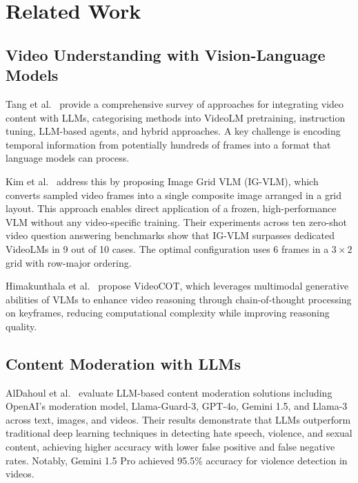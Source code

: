 \documentclass[12pt,a4paper]{article}
\begin{document}
\section{Related Work}

\subsection{Video Understanding with Vision-Language Models}

Tang et al.~\cite{tang2023vidllm} provide a comprehensive survey of
approaches for integrating video content with LLMs, categorising methods
into VideoLM pretraining, instruction tuning, LLM-based agents, and
hybrid approaches. A key challenge is encoding temporal information from
potentially hundreds of frames into a format that language models can
process.

Kim et al.~\cite{kim2024imagegrid} address this by proposing Image Grid
VLM (IG-VLM), which converts sampled video frames into a single composite
image arranged in a grid layout. This approach enables direct application
of a frozen, high-performance VLM without any video-specific training.
Their experiments across ten zero-shot video question answering benchmarks
show that IG-VLM surpasses dedicated VideoLMs in 9 out of 10 cases.
The optimal configuration uses 6 frames in a $3 \times 2$ grid with
row-major ordering.

Himakunthala et al.~\cite{himakunthala2023videocot} propose VideoCOT,
which leverages multimodal generative abilities of VLMs to enhance video
reasoning through chain-of-thought processing on keyframes, reducing
computational complexity while improving reasoning quality.

\subsection{Content Moderation with LLMs}

AlDahoul et al.~\cite{aldahoul2024contentmod} evaluate LLM-based content
moderation solutions including OpenAI's moderation model, Llama-Guard-3,
GPT-4o, Gemini 1.5, and Llama-3 across text, images, and videos.
Their results demonstrate that LLMs outperform traditional deep learning
techniques in detecting hate speech, violence, and sexual content, achieving
higher accuracy with lower false positive and false negative rates.
Notably, Gemini 1.5 Pro achieved 95.5\% accuracy for violence detection
in videos.
\end{document}
